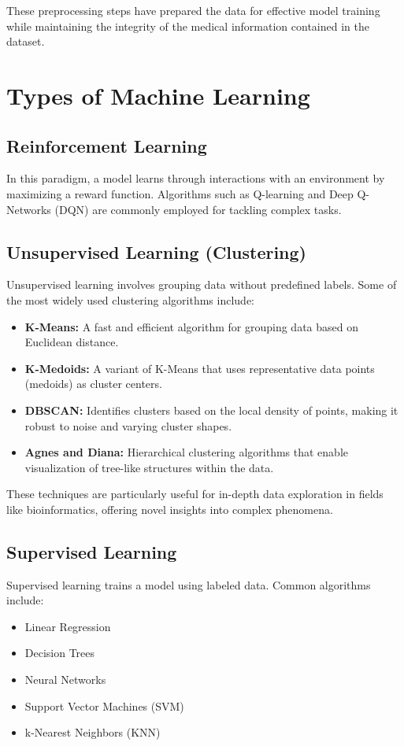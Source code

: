 \documentclass[a4paper,12pt]{article}
\begin{document}
These preprocessing steps have prepared the data for effective model training while maintaining the integrity of the medical information contained in the dataset.

\section{Types of Machine Learning}
\subsection{Reinforcement Learning}
In this paradigm, a model learns through interactions with an environment by maximizing a reward function. Algorithms such as Q-learning and Deep Q-Networks (DQN) are commonly employed for tackling complex tasks.

\subsection{Unsupervised Learning (Clustering)}
Unsupervised learning involves grouping data without predefined labels. Some of the most widely used clustering algorithms include:
\begin{itemize}
    \item \textbf{K-Means:} A fast and efficient algorithm for grouping data based on Euclidean distance.
    \item \textbf{K-Medoids:} A variant of K-Means that uses representative data points (medoids) as cluster centers.
    \item \textbf{DBSCAN:} Identifies clusters based on the local density of points, making it robust to noise and varying cluster shapes.
    \item \textbf{Agnes and Diana:} Hierarchical clustering algorithms that enable visualization of tree-like structures within the data.
\end{itemize}
These techniques are particularly useful for in-depth data exploration in fields like bioinformatics, offering novel insights into complex phenomena.

\subsection{Supervised Learning}
Supervised learning trains a model using labeled data. Common algorithms include:

\begin{itemize}
    \item Linear Regression
    \item Decision Trees
    \item Neural Networks
    \item Support Vector Machines (SVM)
    \item k-Nearest Neighbors (KNN)
\end{itemize}
\end{document}
